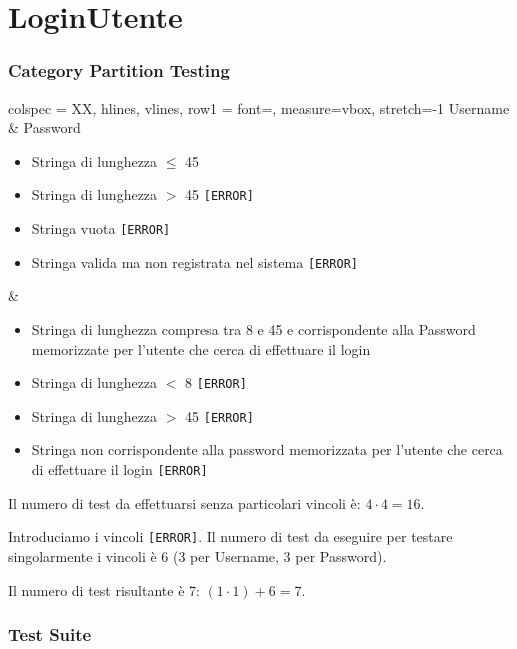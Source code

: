 \section{LoginUtente}

\subsubsection*{Category Partition Testing}

\begin{table}[!hbp]
	\centering
	\footnotesize
	\begin{tblr}{
		colspec = XX,
		hlines, vlines,
		row{1} = {font=\bfseries},
		measure=vbox, stretch=-1
		}
		Username & Password \\
		\begin{itemize}[leftmargin=*]
			\item Stringa di lunghezza $\leq$ 45
			\item Stringa di lunghezza $>$ 45 \texttt{[ERROR]}
			\item Stringa vuota \texttt{[ERROR]}
			\item Stringa valida ma non registrata nel sistema \texttt{[ERROR]}
		\end{itemize} &
		\begin{itemize}[leftmargin=*]
			\item Stringa di lunghezza compresa tra 8 e 45 e corrispondente alla Password memorizzate per l'utente che cerca di effettuare il login
			\item Stringa di lunghezza $<$ 8 \texttt{[ERROR]}
			\item Stringa di lunghezza $>$ 45 \texttt{[ERROR]}
			\item Stringa non corrispondente alla password memorizzata per l'utente che cerca di effettuare il login \texttt{[ERROR]}
		\end{itemize}
	\end{tblr}
\end{table}

\noindent Il numero di test da effettuarsi senza particolari vincoli è: $4 \cdot 4 = 16$.

\noindent Introduciamo i vincoli \texttt{[ERROR]}. Il numero di test da eseguire per testare singolarmente i vincoli è 6 (3 per Username, 3 per Password).

\noindent Il numero di test risultante è 7: $(1 \cdot 1) + 6 = 7$.

\subsubsection*{Test Suite}

